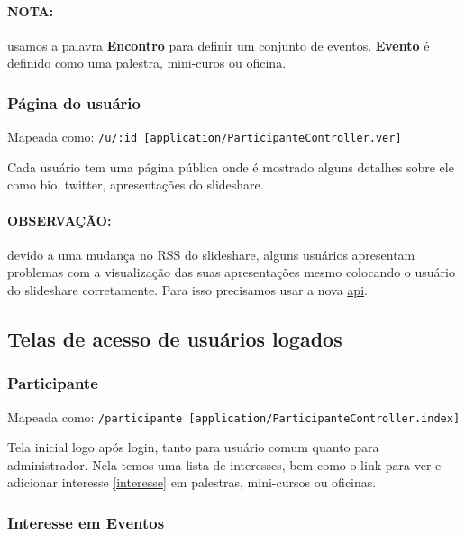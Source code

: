 \paragraph{NOTA:}

usamos a palavra \textbf{Encontro} para definir um conjunto de eventos.
\textbf{Evento} é definido como uma palestra, mini-curos ou oficina.

\subsubsection{Página do usuário \label{usuario}}

Mapeada como:
\texttt{/u/:id {[}application/ParticipanteController.ver{]}}

Cada usuário tem uma página pública onde é mostrado alguns detalhes
sobre ele como bio, twitter, apresentações do slideshare.

\paragraph{OBSERVAÇÃO:}

devido a uma mudança no RSS do slideshare, alguns usuários apresentam
problemas com a visualização das suas apresentações mesmo colocando o
usuário do slideshare corretamente. Para isso precisamos usar a nova
\href{http://apiexplorer.slideshare.net/}{api}.

\subsection{Telas de acesso de usuários logados}

\subsubsection{Participante \label{participante}}

Mapeada como:
\texttt{/participante {[}application/ParticipanteController.index{]}}

Tela inicial logo após login, tanto para usuário comum quanto para
administrador. Nela temos uma lista de interesses, bem como o link para
ver e adicionar interesse \ref{interesse} em palestras, mini-cursos ou
oficinas.

\subsubsection{Interesse em Eventos \label{interesse}}

